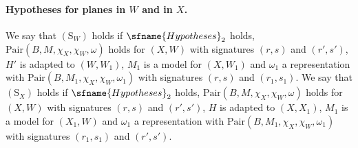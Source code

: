 \paragraph{Hypotheses for planes in $W$ and in $X$.}
We say that $(\mathrm{S}_W)$ holds if $\sfname{Hypotheses}_2$ holds, $\mathrm{Pair}(B,M,\chi_X,\chi_W,\omega)$ holds for
$(X,W)$ with signatures $(r,s)$ and $(r',s')$, $H'$ is adapted to $(W,W_1)$, $M_1$ is a model for $(X,W_1)$ and
$\omega_1$ a representation with $\mathrm{Pair}(B,M_1,\chi_X,\chi_W,\omega_1)$ with signatures $(r,s)$ and $(r_1,s_1)$.
We say that $(\mathrm{S}_X)$ holds if $\sfname{Hypotheses}_2$ holds, $\mathrm{Pair}(B,M,\chi_X,\chi_W,\omega)$ holds for
$(X,W)$ with signatures $(r,s)$ and $(r',s')$, $H$ is adapted to $(X,X_1)$, $M_1$ is a model for $(X_1,W)$ and
$\omega_1$ a representation with $\mathrm{Pair}(B,M_1,\chi_X,\chi_W,\omega_1)$ with signatures $(r_1,s_1)$ and $(r',s')$.
